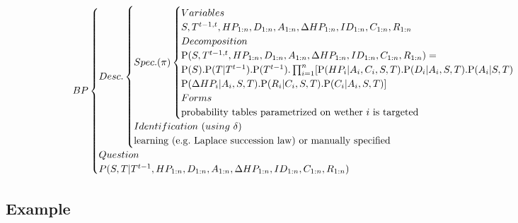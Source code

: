 \begin{eqnarray*}
BP
\begin{cases}
Desc.
    \begin{cases}
    Spec. (\pi)
        \begin{cases}
        Variables\\
        S, T^{t-1,t}, HP_{1:n}, D_{1:n}, A_{1:n}, \Delta HP_{1:n}, ID_{1:n}, C_{1:n}, R_{1:n}\\
        Decomposition\\
        \PP(S, T^{t-1,t}, HP_{1:n}, D_{1:n}, A_{1:n}, \Delta HP_{1:n}, ID_{1:n}, C_{1:n}, R_{1:n}) = \\
        \PP(S).\PP(T|T^{t-1}).\PP(T^{t-1}).\prod_{i=1}^n [ \PP(HP_i | A_i, C_i, S, T).\PP(D_i | A_i, S, T).\PP(A_i | S, T) \\
                \PP(\Delta HP_i | A_i, S, T). \PP(R_i | C_i, S, T). \PP(C_i | A_i, S, T) ]\\
        Forms\\
        \mathrm{probability\ tables\ parametrized\ on\ wether\ }i\ \mathrm{is\ targeted}\\
        \end{cases}\\
    Identification\ (using\ \delta)\\
    \mathrm{learning\ (e.g.\ Laplace\ succession\ law)\ or\ manually\ specified}\\
    \end{cases}\\
Question\\
P(S,T|T^{t-1}, HP_{1:n}, D_{1:n}, A_{1:n}, \Delta HP_{1:n}, ID_{1:n}, C_{1:n}, R_{1:n})
\end{cases}
\end{eqnarray*}

\subsection{Example}

